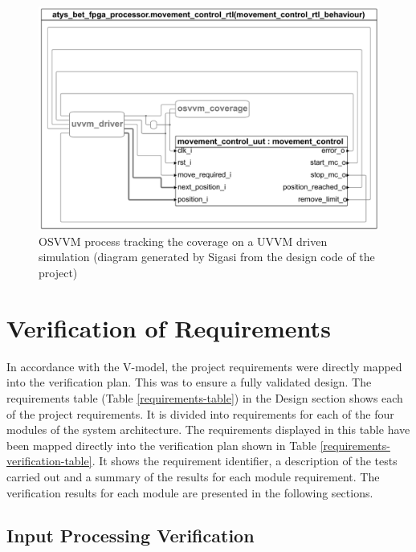 \begin{figure}[h]
\centering
\includegraphics[width=\textwidth]{images/osvvmblockdiagram.pdf}
\caption{OSVVM process tracking the coverage on a UVVM driven simulation (diagram generated by Sigasi from the design code of the project)}
\label{osvvm_sim}
\end{figure}

\section{Verification of Requirements}

In accordance with the V-model, the project requirements were directly mapped into the verification plan. This was to ensure a fully validated design. The requirements table (Table \ref{requirements-table}) in the Design section shows each of the project requirements. It is divided into requirements for each of the four modules of the system architecture. The requirements displayed in this table have been mapped directly into the verification plan shown in Table \ref{requirements-verification-table}. It shows the requirement identifier, a description of the tests carried out and a summary of the results for each module requirement. The verification results for each module are presented in the following sections.



\subsection{Input Processing Verification}

